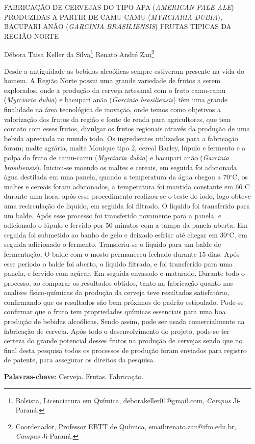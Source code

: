 \documentclass[article,12pt,onesidea,4paper,english,brazil]{abntex2}
\begin{document}
	
	
	\frenchspacing 
	
	\begin{center}
		\LARGE FABRICAÇÃO DE CERVEJAS DO TIPO APA (\MakeUppercase{\textit{American Pale Ale}}) PRODUZIDAS
		A PARTIR DE CAMU-CAMU (\MakeUppercase{\textit{Myrciaria dubia}}),\\ BACUPARI ANÃO (\MakeUppercase{\textit{Garcinia
		brasiliensis}}) FRUTAS TIPICAS DA REGIÃO NORTE
		
		\normalsize
		Débora Taisa Keller da Silva\footnote{Bolsista, Licenciatura em Química, deborakeller01@gmail.com, \textit{Campus} Jí-Paraná.} 
		Renato André Zan\footnote{Coordenador, Professor EBTT de Química, email:renato.zan@ifro.edu.br, \textit{Campus} Jí-Paraná.}
	\end{center}
	
	\noindent Desde a antiguidade as bebidas alcoólicas sempre estiveram presente na vida do homem. A Região Norte possui uma grande variedade de frutos a serem
	explorados, onde a produção da cerveja artesanal com o fruto camu-camu (\textit{Myrciaria
	dubia}) e bacupari anão (\textit{Garcinia brasiliensis}) têm uma grande finalidade na área
	tecnológica de inovação, onde temos como objetivos a valorização dos frutos da
	região e fonte de renda para agricultores, que tem contato com esses frutos, divulgar
	os frutos regionais através da produção de uma bebida apreciada no mundo todo.
	Os ingredientes utilizados para a fabricação foram; malte agrária, malte
	Monique tipo 2, cereal Barley, lúpulo e fermento e a polpa do fruto de camu-camu
	(\textit{Myrciaria dubia}) e bacupari anão (\textit{Garcinia brasiliensis}). Iniciou-se moendo os maltes e cereais, em seguida foi adicionada água destilada em uma panela, quando
	a temperatura da água chegou a 70$^\circ$C, os maltes e cereais foram adicionados, a
	temperatura foi mantida constante em 66$^\circ$C durante uma hora, após esse
	procedimento realizou-se o teste do iodo, logo obteve uma recirculação de liquido,
	em seguida foi filtrado. O líquido foi transferido para um balde. Após esse processo
	foi transferido novamente para a panela, e adicionado o lúpulo e fervido por 50
	minutos com a tampa da panela aberta. Em seguida foi submetido ao banho de gelo
	e deixado esfriar até chegar em 30$^\circ$C, em seguida adicionado o fermento.
	Transferiu-se o liquido para um balde de fermentação. O balde com o mosto
	permaneceu fechado durante 15 dias. Após esse período o balde foi aberto, o liquido
	filtrado, e foi transferido para uma panela, e fervido com açúcar. Em seguida
	envasado e maturado. Durante todo o processo, ao comparar os
	resultados obtidos, tanto na fabricação quanto nas analises físico-químicas da
	produção da cerveja teve resultados satisfatório, confirmando que os resultados são
	bem próximos do padrão estipulado. Pode-se confirmar que o fruto tem propriedades
	químicas essenciais para uma boa produção de bebidas alcoólicas. Sendo assim,
	pode ser usada comercialmente na fabricação de cerveja. Após todo o
	desenvolvimento do projeto, pode-se ter certeza do grande potencial desses frutos
	na produção de cervejas sendo que no final desta pesquisa todos os processos de
	produção foram enviados para registro de patente, para assegurar os direitos da
	pesquisa.
	
	\vspace{\onelineskip}
	
	\noindent
	\textbf{Palavras-chave}: Cerveja. Frutas. Fabricação.
	
\end{document}
